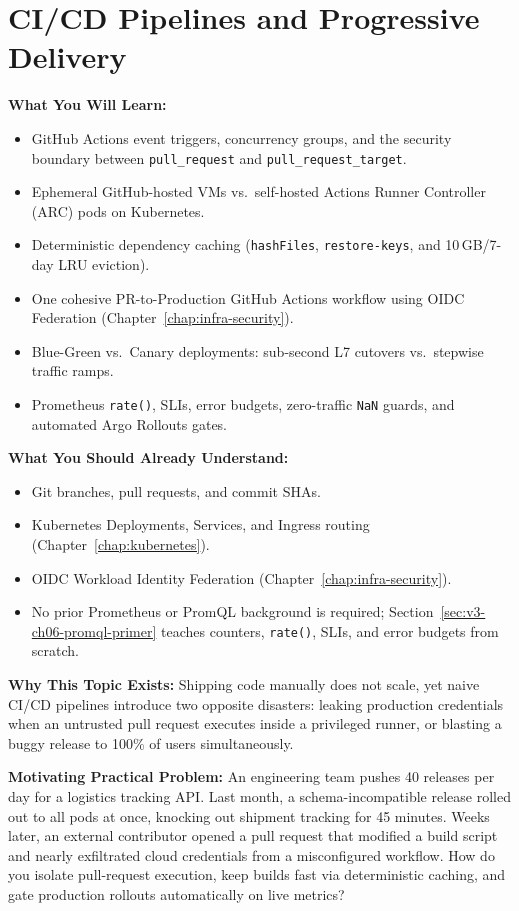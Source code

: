 \chapter{CI/CD Pipelines and Progressive Delivery}
\label{chap:cicd}

\begin{chaptergoalsbox}
\textbf{What You Will Learn:}
\begin{itemize}[leftmargin=12pt]
  \item GitHub Actions event triggers, concurrency groups, and the security boundary between \texttt{pull\_request} and \texttt{pull\_request\_target}.
  \item Ephemeral GitHub-hosted VMs vs.\ self-hosted Actions Runner Controller (ARC) pods on Kubernetes.
  \item Deterministic dependency caching (\texttt{hashFiles}, \texttt{restore-keys}, and 10\,GB/7-day LRU eviction).
  \item One cohesive PR-to-Production GitHub Actions workflow using OIDC Federation (Chapter~\ref{chap:infra-security}).
  \item Blue-Green vs.\ Canary deployments: sub-second L7 cutovers vs.\ stepwise traffic ramps.
  \item Prometheus \texttt{rate()}, SLIs, error budgets, zero-traffic \texttt{NaN} guards, and automated Argo Rollouts gates.
\end{itemize}

\textbf{What You Should Already Understand:}
\begin{itemize}[leftmargin=12pt]
  \item Git branches, pull requests, and commit SHAs.
  \item Kubernetes Deployments, Services, and Ingress routing (Chapter~\ref{chap:kubernetes}).
  \item OIDC Workload Identity Federation (Chapter~\ref{chap:infra-security}).
  \item No prior Prometheus or PromQL background is required; Section~\ref{sec:v3-ch06-promql-primer} teaches counters, \texttt{rate()}, SLIs, and error budgets from scratch.
\end{itemize}

\textbf{Why This Topic Exists:}
Shipping code manually does not scale, yet naive CI/CD pipelines introduce two opposite disasters: leaking production credentials when an untrusted pull request executes inside a privileged runner, or blasting a buggy release to 100\% of users simultaneously.

\textbf{Motivating Practical Problem:}
An engineering team pushes 40 releases per day for a logistics tracking API. Last month, a schema-incompatible release rolled out to all pods at once, knocking out shipment tracking for 45 minutes. Weeks later, an external contributor opened a pull request that modified a build script and nearly exfiltrated cloud credentials from a misconfigured workflow. How do you isolate pull-request execution, keep builds fast via deterministic caching, and gate production rollouts automatically on live metrics?
\end{chaptergoalsbox}

